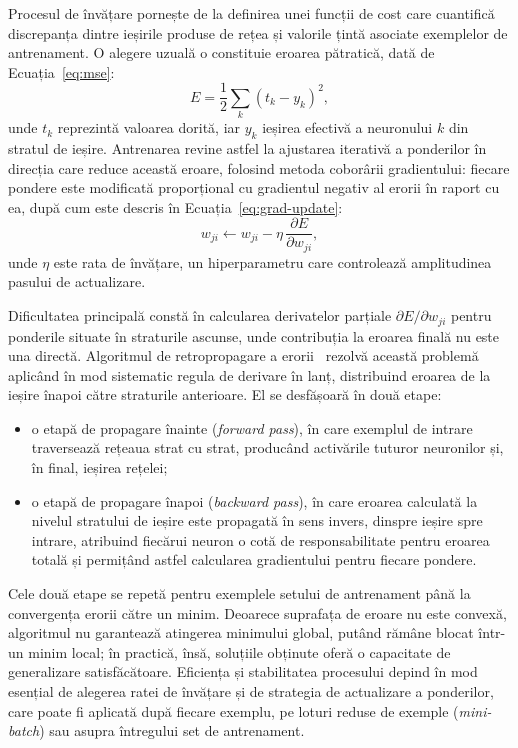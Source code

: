 Procesul de învățare pornește de la definirea unei funcții de cost care cuantifică discrepanța dintre ieșirile produse de rețea și valorile țintă asociate exemplelor de antrenament. O alegere uzuală o constituie eroarea pătratică, dată de Ecuația~\ref{eq:mse}:
\begin{equation}
  E = \frac{1}{2} \sum_{k} (t_k - y_k)^2,
  \label{eq:mse}
\end{equation}
unde $t_k$ reprezintă valoarea dorită, iar $y_k$ ieșirea efectivă a neuronului $k$ din stratul de ieșire. Antrenarea revine astfel la ajustarea iterativă a ponderilor în direcția care reduce această eroare, folosind metoda coborârii gradientului: fiecare pondere este modificată proporțional cu gradientul negativ al erorii în raport cu ea, după cum este descris în Ecuația~\ref{eq:grad-update}:
\begin{equation}
  w_{ji} \leftarrow w_{ji} - \eta\, \frac{\partial E}{\partial w_{ji}},
  \label{eq:grad-update}
\end{equation}
unde $\eta$ este rata de învățare, un hiperparametru care controlează amplitudinea pasului de actualizare.

Dificultatea principală constă în calcularea derivatelor parțiale $\partial E / \partial w_{ji}$ pentru ponderile situate în straturile ascunse, unde contribuția la eroarea finală nu este una directă. Algoritmul de retropropagare a erorii~\cite{rumelhart1986learning} rezolvă această problemă aplicând în mod sistematic regula de derivare în lanț, distribuind eroarea de la ieșire înapoi către straturile anterioare. El se desfășoară în două etape:
\begin{itemize}
  \item o etapă de propagare înainte (\textit{forward pass}), în care exemplul de intrare traversează rețeaua strat cu strat, producând activările tuturor neuronilor și, în final, ieșirea rețelei;
  \item o etapă de propagare înapoi (\textit{backward pass}), în care eroarea calculată la nivelul stratului de ieșire este propagată în sens invers, dinspre ieșire spre intrare, atribuind fiecărui neuron o cotă de responsabilitate pentru eroarea totală și permițând astfel calcularea gradientului pentru fiecare pondere.
\end{itemize}

Cele două etape se repetă pentru exemplele setului de antrenament până la convergența erorii către un minim. Deoarece suprafața de eroare nu este convexă, algoritmul nu garantează atingerea minimului global, putând rămâne blocat într-un minim local; în practică, însă, soluțiile obținute oferă o capacitate de generalizare satisfăcătoare. Eficiența și stabilitatea procesului depind în mod esențial de alegerea ratei de învățare și de strategia de actualizare a ponderilor, care poate fi aplicată după fiecare exemplu, pe loturi reduse de exemple (\textit{mini-batch}) sau asupra întregului set de antrenament.

